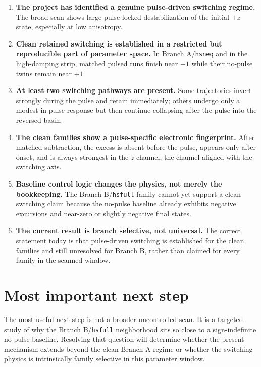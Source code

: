 \documentclass[11pt]{article}
\begin{document}
\begin{enumerate}
\item \textbf{The project has identified a genuine pulse-driven switching regime.} The broad scan shows large pulse-locked destabilization of the initial \(+z\) state, especially at low anisotropy.

\item \textbf{Clean retained switching is established in a restricted but reproducible part of parameter space.} In Branch A/\texttt{hsneq} and in the high-damping strip, matched pulsed runs finish near \(-1\) while their no-pulse twins remain near \(+1\).

\item \textbf{At least two switching pathways are present.} Some trajectories invert strongly during the pulse and retain immediately; others undergo only a modest in-pulse response but then continue collapsing after the pulse into the reversed basin.

\item \textbf{The clean families show a pulse-specific electronic fingerprint.} After matched subtraction, the excess is absent before the pulse, appears only after onset, and is always strongest in the \(z\) channel, the channel aligned with the switching axis.

\item \textbf{Baseline control logic changes the physics, not merely the bookkeeping.} The Branch B/\texttt{hsfull} family cannot yet support a clean switching claim because the no-pulse baseline already exhibits negative excursions and near-zero or slightly negative final states.

\item \textbf{The current result is branch selective, not universal.} The correct statement today is that pulse-driven switching is established for the clean families and still unresolved for Branch B, rather than claimed for every family in the scanned window.
\end{enumerate}

\section{Most important next step}
The most useful next step is not a broader uncontrolled scan. It is a targeted study of why the Branch B/\texttt{hsfull} neighborhood sits so close to a sign-indefinite no-pulse baseline. Resolving that question will determine whether the present mechanism extends beyond the clean Branch A regime or whether the switching physics is intrinsically family selective in this parameter window.
\end{document}

